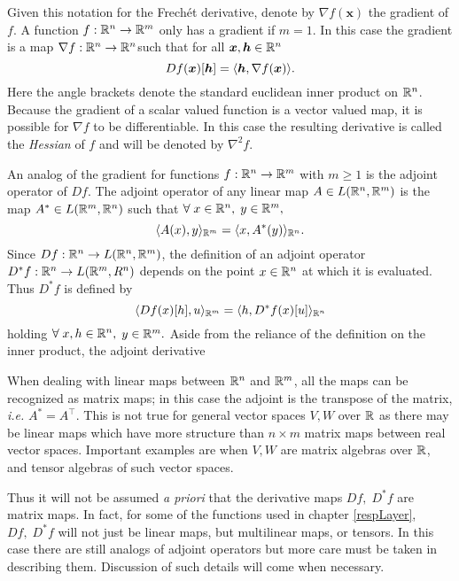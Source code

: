 Given this notation for the Frech\'et derivative, denote by \( \nabla f(\bm x) \) the gradient of \( f \). A function \( f:\mathbb R^n\rightarrow \mathbb R^m \) only has a gradient if \( m = 1 \). In this case the gradient is a map \( \nabla f:\mathbb R^n\rightarrow\mathbb R^n \)such that for all \( \bm x, \bm h \in \mathbb R^n \)
\begin{equation}\label{eqn:gradDef}
 Df(\bm x)[\bm h] = \langle\bm h, \nabla f(\bm x)\rangle.
\end{equation} 
Here the angle brackets denote the standard euclidean inner product on \( \mathbb R^n \).  Because the gradient of a scalar valued function is a vector valued map, it is possible for \( \nabla f \) to be differentiable. In this case the resulting derivative is called the \textit{Hessian} of \( f \) and will be denoted by \( \nabla^2 f. \) 

An analog of the gradient for functions \( f:\mathbb R^n\rightarrow\mathbb R^m \) with \( m\geq 1 \) is the adjoint operator of \( Df \). The adjoint operator of any linear map \( A\in L(\mathbb R^n,\mathbb R^m) \) is the map \( A^{\ast}\in L(\mathbb R^m,\mathbb R^n) \) such that \( \forall\; x\in\mathbb R^n,\) \(y\in\mathbb R^m, \) 
\[ \langle A(x),y\rangle_{\mathbb R^m} = \langle x,A^{\ast}(y)\rangle_{\mathbb R^n}. \]
Since \( Df:\mathbb R^n\rightarrow L(\mathbb R^n,\mathbb R^m) \), the definition of an adjoint operator \( D^{\ast}f:\mathbb R^n\rightarrow L(\mathbb R^m,R^n)\) depends on the point \( x\in\mathbb R^n \) at which it is evaluated.  Thus \( D^{\ast}f \) is defined by 
\begin{equation*}
\langle Df(x)[h],u\rangle_{\mathbb R^m} = \langle h,D^{\ast}f(x)[u]\rangle_{\mathbb R^n}
\end{equation*}
holding \( \forall\; x,h\in\mathbb R^n,\) \(y\in\mathbb R^m.\) Aside from the reliance of the definition on the inner product, the adjoint derivative 

When dealing with linear maps between \( \mathbb R^n \) and \( \mathbb R^m \), all the maps can be recognized as matrix maps; in this case the adjoint is the transpose of the matrix, \textit{i.e.} \( A^\ast = A^{\intercal} \). This is not true for general vector spaces \( V,W \) over \( \mathbb R \) as there may be linear maps which have more structure than \( n\times m \) matrix maps between real vector spaces. Important examples are when \( V,W \) are matrix algebras over \( \mathbb R \), and tensor algebras of such vector spaces.

Thus it will not be assumed \textit{a priori} that the derivative maps \( Df,\;D^{\ast}f \) are matrix maps.  In fact, for some of the functions used in chapter \ref{respLayer}, \( Df,\;D^{\ast}f \) will not just be linear maps, but multilinear maps, or tensors.  In this case there are still analogs of adjoint operators but more care must be taken in describing them. Discussion of such details will come when necessary.

